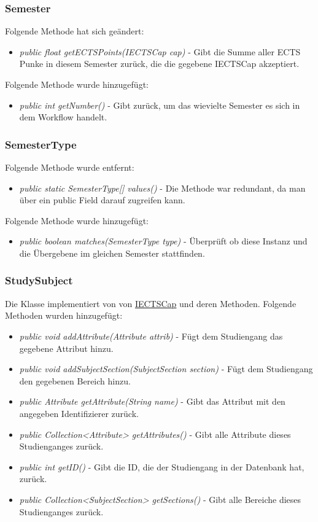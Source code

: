 \documentclass[parskip=full]{scrartcl}
\begin{document}
			\subsubsection{Semester}
				Folgende Methode hat sich geändert:
				\begin{itemize}
					\item \textit{public float getECTSPoints(IECTSCap cap)} - Gibt die Summe aller ECTS Punke in diesem Semester zurück, die die gegebene IECTSCap akzeptiert.
				\end{itemize}
				
				Folgende Methode wurde hinzugefügt:
				\begin{itemize}
					\item \textit{public int getNumber()} - Gibt zurück, um das wievielte Semester es sich in dem Workflow handelt.
				\end{itemize}
			
			\subsubsection{SemesterType}
				Folgende Methode wurde entfernt:
				\begin{itemize}
					\item  \textit{public static SemesterType[] values()} - Die Methode war redundant, da man über ein public Field darauf zugreifen kann.
				\end{itemize}
			
				Folgende Methode wurde hinzugefügt:
				\begin{itemize}
					\item \textit{public boolean matches(SemesterType type)} - Überprüft ob diese Instanz und die Übergebene im gleichen Semester stattfinden.
				\end{itemize}
			
			\subsubsection{StudySubject}
				Die Klasse implementiert von von \hyperlink{model:IECTSCap}{IECTSCap} und deren Methoden.
				Folgende Methoden wurden hinzugefügt:
				\begin{itemize}
					\item \textit{public void addAttribute(Attribute attrib)} - Fügt dem Studiengang das gegebene Attribut hinzu.
					\item \textit{public void addSubjectSection(SubjectSection section)} - Fügt dem Studiengang den gegebenen Bereich hinzu.
					\item \textit{public Attribute getAttribute(String name)} - Gibt das Attribut mit den angegeben Identifizierer zurück.
					\item \textit{public Collection<Attribute> getAttributes()} - Gibt alle Attribute dieses Studienganges zurück.
					\item \textit{public int getID()} - Gibt die ID, die der Studiengang in der Datenbank hat, zurück.
					\item \textit{public Collection<SubjectSection> getSections()} - Gibt alle Bereiche dieses Studienganges zurück.
				\end{itemize}
			
\end{document}

